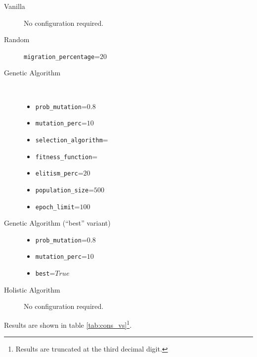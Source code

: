 \begin{description}
  \item[Vanilla] No configuration required.
  \item[Random] \texttt{migration\_percentage}=$20$
  \item[Genetic Algorithm] \hfill \\
    \begin{itemize}
      \item \texttt{prob\_mutation}=$0.8$
      \item \texttt{mutation\_perc}=$10$
      \item \texttt{selection\_algorithm}=
      \item \texttt{fitness\_function}=
      \item \texttt{elitism\_perc}=$20$
      \item \texttt{population\_size}=$500$
      \item \texttt{epoch\_limit}=$100$
    \end{itemize}
  \item[Genetic Algorithm (``best'' variant)]
    \begin{itemize}
      \item \texttt{prob\_mutation}=$0.8$
      \item \texttt{mutation\_perc}=$10$
      \item \texttt{best}=$True$
    \end{itemize}
  \item[Holistic Algorithm] No configuration required.
\end{description}

Results are shown in table \ref{tab:cons_vs}\footnote{Results are truncated at the third decimal digit.}.

